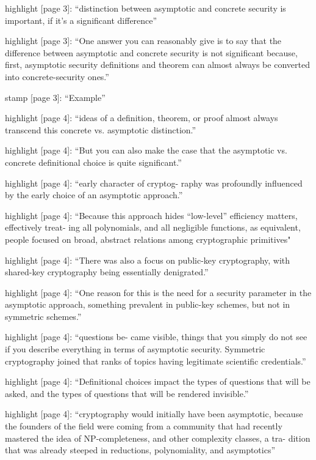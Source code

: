 highlight {[}page 3{]}: ``distinction between asymptotic and concrete
security is important, if it's a significant difference''

highlight {[}page 3{]}: ``One answer you can reasonably give is to say
that the difference between asymptotic and concrete security is not significant because, first, asymptotic security definitions and
theorem can almost always be converted into concrete-security ones.''

stamp {[}page 3{]}: ``Example''

highlight {[}page 4{]}: ``ideas of a definition, theorem, or proof
almost always transcend this concrete vs. asymptotic distinction.''

highlight {[}page 4{]}: ``But you can also make the case that the asymptotic vs. concrete definitional choice is quite significant.''

highlight {[}page 4{]}: ``early character of cryptog- raphy was
profoundly influenced by the early choice of an asymptotic approach.''

highlight {[}page 4{]}: ``Because this approach hides ``low-level''
efficiency matters, effectively treat- ing all polynomials, and all
negligible functions, as equivalent, people focused on broad, abstract
relations among cryptographic primitives"

highlight {[}page 4{]}: ``There was also a focus on public-key
cryptography, with shared-key cryptography being essentially
denigrated.''

highlight {[}page 4{]}: ``One reason for this is the need for a security
parameter in the asymptotic approach, something prevalent in public-key
schemes, but not in symmetric schemes.''

highlight {[}page 4{]}: ``questions be- came visible, things that you
simply do not see if you describe everything in terms of asymptotic
security. Symmetric cryptography joined that ranks of topics having
legitimate scientific credentials.''

highlight {[}page 4{]}: ``Definitional choices impact the types of questions that will be asked, and the types of questions that will be rendered invisible.''

highlight {[}page 4{]}: ``cryptography would initially have been asymptotic, because the founders of the field were coming from a
community that had recently mastered the idea of NP-completeness, and
other complexity classes, a tra- dition that was already steeped in
reductions, polynomiality, and asymptotics''

